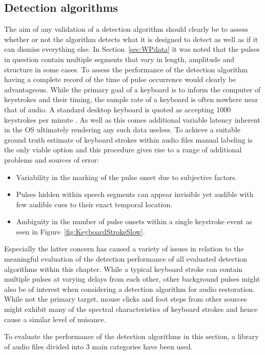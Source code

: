 \subsection{Detection algorithms}
The aim of any validation of a detection algorithm should clearly be to assess whether or not the algorithm detects what it is designed to detect as well as if it can dismiss everything else. In Section~\ref{sec:WPdata} it was noted that the pulses in question contain multiple segments that vary in length, amplitude and structure in some cases. To assess the performance of the detection algorithm having a complete record of the time of pulse occurrence would clearly be advantageous. While the primary goal of a keyboard is to inform the computer of keystrokes and their timing, the sample rate of a keyboard is often nowhere near that of audio. A standard desktop keyboard is quoted as accepting 1000 keystrokes per minute \cite{MSCurveKeyboard3000}. As well as this comes additional variable latency inherent in the OS ultimately rendering any such data useless. To achieve a suitable ground truth estimate of keyboard strokes within audio files manual labeling is the only viable option and this procedure gives rise to a range of additional problems and sources of error:

\begin{itemize}
  \item Variability in the marking of the pulse onset due to subjective factors.
  \item Pulses hidden within speech segments can appear invisible yet audible with few audible cues to their exact temporal location.
  \item Ambiguity in the number of pulse onsets within a single keystroke event as seen in Figure~\ref{fig:KeyboardStrokeSlow}.
\end{itemize}

Especially the latter concern has caused a variety of issues in relation to the meaningful evaluation of the detection performance of all evaluated detection algorithms within this chapter. While a typical keyboard stroke can contain multiple pulses at varying delays from each other, other background pulses might also be of interest when considering a detection algorithm for audio restoration. While not the primary target, mouse clicks and foot steps from other sources might exhibit many of the spectral characteristics of keyboard strokes and hence cause a similar level of nuisance.

To evaluate the performance of the detection algorithms in this section, a library of audio files divided into 3 main categories have been used.

